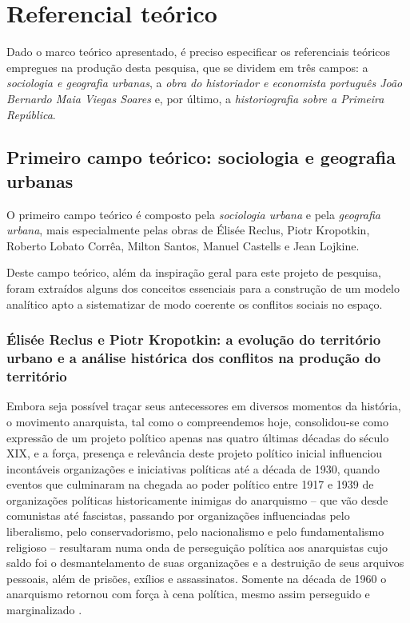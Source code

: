 \section{Referencial teórico}
\label{sec:refeteor}

Dado o marco teórico apresentado, é preciso especificar os referenciais teóricos empregues na produção desta pesquisa, que se dividem em três campos: a \textit{sociologia e geografia urbanas}, a \textit{obra do historiador e economista português João Bernardo Maia Viegas Soares} e, por último, a \textit{historiografia sobre a Primeira República}.

\subsection{Primeiro campo teórico: sociologia e geografia urbanas}
\label{subsec:sociogeogrurb}

O primeiro campo teórico é composto pela \textit{sociologia urbana} e pela \textit{geografia urbana}, mais especialmente pelas obras de Élisée Reclus, Piotr Kropotkin, Roberto Lobato Corrêa, Milton Santos, Manuel Castells e Jean Lojkine.

Deste campo teórico, além da inspiração geral para este projeto de pesquisa, foram extraídos alguns dos conceitos essenciais para a construção de um modelo analítico apto a sistematizar de modo coerente os conflitos sociais no espaço.

\subsubsection{Élisée Reclus e Piotr Kropotkin: a evolução do território urbano e a análise histórica dos conflitos na produção do território}

Embora seja possível traçar seus antecessores em diversos momentos da história, o movimento anarquista, tal como o compreendemos hoje, consolidou-se como expressão de um projeto político apenas nas quatro últimas décadas do século XIX, e a força, presença e relevância deste projeto político inicial influenciou incontáveis organizações e iniciativas políticas até a década de 1930, quando eventos que culminaram na chegada ao poder político entre 1917 e 1939 de organizações políticas historicamente inimigas do anarquismo -- que vão desde comunistas até fascistas, passando por organizações influenciadas pelo liberalismo, pelo conservadorismo, pelo nacionalismo e pelo fundamentalismo religioso -- resultaram numa onda de perseguição política aos anarquistas cujo saldo foi o desmantelamento de suas organizações e a destruição de seus arquivos pessoais, além de prisões, exílios e assassinatos. Somente na década de 1960 o anarquismo retornou com força à cena política, mesmo assim perseguido e marginalizado \cite{WOODCOCK2008}. 

